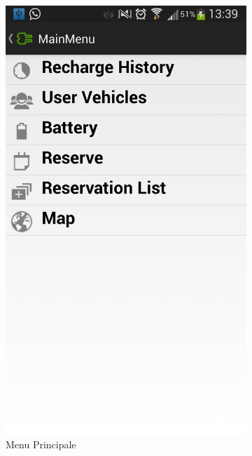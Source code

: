 \begin{figure}
\begin{subfigure}{0.45\textwidth}
		\includegraphics[width=\textwidth]{assets/mobile-app-main-menu.png}
		\caption{Menu Principale}
		\label{fig:main-menu}
	\end{subfigure}
	\begin{subfigure}{0.45\textwidth}

\end{subfigure}
\end{figure}
